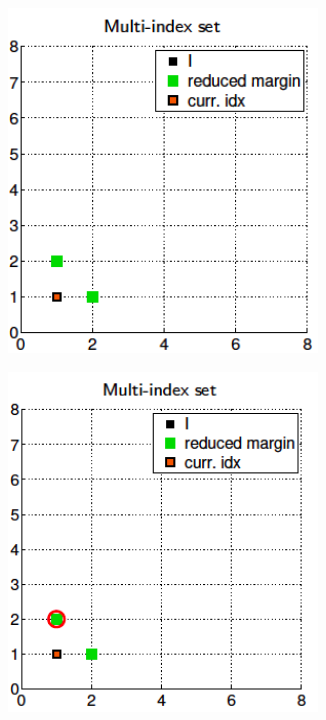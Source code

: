 \documentclass[ima, 20pt, portrait, plainboxedsections]{sciposter}
\begin{document}
\begin{multicols}{3}
\begin{figure}
\begin{subfigure}{0.3\textwidth}
		\centering
		\includegraphics[width=0.9\textwidth]{./MISC_construction/2}
		\caption{}
	\end{subfigure}\hfil
	\begin{subfigure}{0.3\textwidth}
		\centering
		\includegraphics[width=0.9\textwidth]{./MISC_construction/3}

\end{subfigure}
\end{figure}
\end{multicols}
\end{document}

